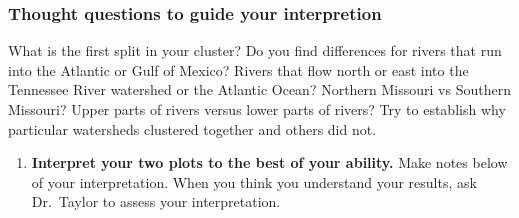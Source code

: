 \documentclass[11pt]{article}
\begin{document}
\subsubsection*{Thought questions to guide your interpretion}

What is the first split in your cluster? Do you find differences for rivers that run into the Atlantic or Gulf of Mexico? Rivers that flow north or east into the Tennessee River watershed or the Atlantic Ocean? Northern Missouri vs Southern Missouri?  Upper parts of rivers versus lower parts of rivers? Try to establish why particular watersheds clustered together and others did not.


\begin{enumerate}[resume]
\item \textbf{Interpret your two plots to the best of your ability.} Make notes below of your interpretation. When you think you understand your results, ask Dr.~Taylor to assess your interpretation.
\end{enumerate}
\end{document}
